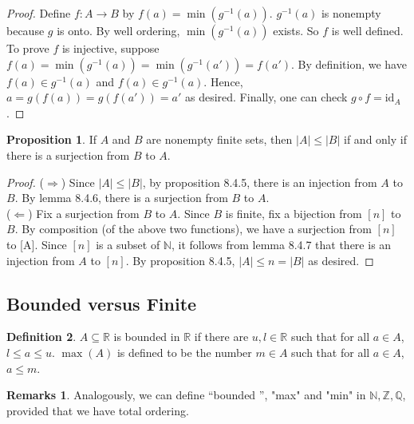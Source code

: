 \documentclass[14pt]{article}
\theoremstyle{definition}
\newtheorem*{remark}{Remarks}
\newtheorem{definition}{Definition}[subsection]
\newtheorem{proposition}[definition]{Proposition}
\newcommand{\fun}[3]{#1\colon #2\rightarrow#3}
\newcommand{\bb}[1]{\mathbb{#1}}
\begin{document}
\begin{proof}
    Define $\fun{f}{A}{B}$ by $f(a)=\min(g^{-1}(a))$. $g^{-1}(a)$ is nonempty because $g$ is onto. By well ordering, $\min(g^{-1}(a))$ exists. So $f$ is well defined.\\
    To prove  $f$ is injective, suppose $f(a)=\min(g^{-1}(a))=\min(g^{-1}(a'))=f(a')$. By definition,
    we have $f(a)\in g^{-1}(a)$ and $f(a)\in g^{-1}(a)$. Hence, $a=g(f(a))=g(f(a'))=a'$ as desired.
    Finally, one can check $g\circ f=\mathrm{id}_A$.
\end{proof}
\vspace{2mm}
\begin{proposition}
    If $A$ and $B$ are nonempty finite sets, then $|A|\leq|B|$ if and only if there is a 
    surjection from $B$ to $A$.
\end{proposition}
\begin{proof}
    ($\Rightarrow$) Since $|A|\leq |B|$, by proposition 8.4.5, there is an injection from $A$
    to $B$. By lemma 8.4.6, there is a surjection from $B$ to $A$.\\
    ($\Leftarrow$) Fix a surjection from $B$ to $A$. Since $B$ is finite, fix a bijection from
    $[n]$ to $B$. By composition (of the above two functions), we have a surjection from $[n]$ to [A].
    Since $[n]$ is a subset of $\bb{N}$, it follows from lemma 8.4.7  that there is an injection from 
    $A$ to $[n]$. By proposition 8.4.5, $|A|\leq n= |B|$ as desired.
\end{proof}

\vspace{5mm}

\subsection{Bounded versus Finite}
\begin{definition}
   $A\subseteq\bb{R}$ is bounded in $\bb{R}$ if there are $u,l\in \bb{R}$ such that for all 
   $a\in A$, $l\leq a\leq u$. $\max(A)$ is defined to be the number $m\in A$ such that for all $a\in A$, $a\leq m$.
\end{definition}

\begin{remark}
    Analogously, we can define “bounded ”, "max" and "min" in $\bb{N}, \bb{Z}, \bb{Q}$, provided that we have total ordering.
\end{remark}

\vspace{2mm}
\end{document}
